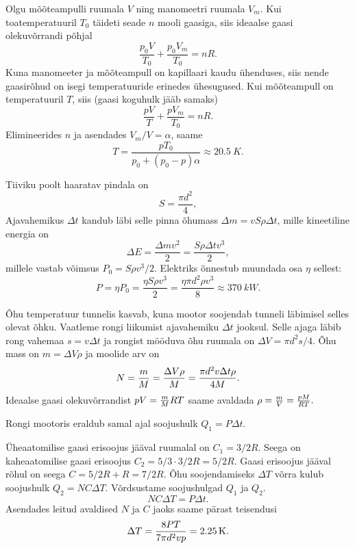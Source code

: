 \documentclass[10pt]{article}
\begin{document}
{%

\solu
Olgu mõõteampulli ruumala $V$ ning manomeetri ruumala $V_m$. Kui toatemperatuuril $T_0$ täideti seade $n$ mooli gaasiga, siis ideaalse gaasi olekuvõrrandi põhjal
\[
\frac{p_0V}{T_0} + \frac{p_0V_m}{T_0} = nR.
\]
Kuna manomeeter ja mõõteampull on kapillaari kaudu ühenduses, siis nende gaasirõhud on isegi temperatuuride erinedes ühesugused. Kui mõõteampull on temperatuuril $T$, siis (gaasi koguhulk jääb samaks)
\[
\frac{pV}{T} + \frac{pV_m}{T_0} = nR.
\]
Elimineerides $n$ ja asendades $V_m/V = \alpha$, saame
\[
T=\frac{p T_{0}}{p_{0}+\left(p_{0}-p\right) \alpha} \approx \SI{20,5}{K}.
\]
\probend
\bigskip


\solu
Tiiviku poolt haaratav pindala on
\[
S = \frac{\pi d^2}{4},
\]
Ajavahemikus $\Delta t$ kandub läbi selle pinna õhumass $\Delta m = vS\rho \Delta t$, mille kineetiline energia on
\[
\Delta E=\frac{\Delta m v^{2}}{2}=\frac{S \rho \Delta t v^{3}}{2},
\]
millele vastab võimsus $P_0 = S\rho v^3/2$. Elektriks õnnestub muundada
osa $\eta$ sellest:
\[
P=\eta P_{0}=\frac{\eta S \rho v^{3}}{2}=\frac{\eta \pi d^2 \rho v^{3}}{8} \approx \SI{370}{kW}.
\]
\probend
\bigskip


\solu
Õhu temperatuur tunnelis kasvab, kuna mootor soojendab tunneli läbimisel selles olevat õhku. Vaatleme rongi liikumist ajavahemiku $\Delta t$ jooksul. Selle ajaga läbib rong vahemaa $s = v \Delta t$ ja rongist mööduva õhu ruumala on $\Delta V = \pi d^2 s /4$. Õhu mass on $m = \Delta V \rho$ ja moolide arv on
\[
N = {m \over M}={\Delta V \rho \over M}={\pi d^2 v \Delta t\rho\over 4M}.
\]
Ideaalse gaasi olekuvõrrandist $pV={m\over M}RT$ saame avaldada $\rho={m\over V}={pM\over RT}.$

Rongi mootoris eraldub samal ajal soojushulk $Q_1 = P \Delta t$.

Üheaatomilise gaasi erisoojus jääval ruumalal on $C_1 = 3/2 R$. Seega on kaheaatomilise gaasi erisoojus $C_2 = 5/3 \cdot 3/2R = 5/2 R$. Gaasi erisoojus jääval rõhul on seega $C = 5/2R + R = 7/2 R$. Õhu soojendamiseks $\Delta T$ võrra kulub soojushulk $Q_2 = N C \Delta T$. Võrdsustame soojushulgad $Q_1$ ja $Q_2$.
\[
N C \Delta T = P \Delta t.
\]
Asendades leitud avaldised $N$ ja $C$ jaoks saame pärast teisendusi
\[
\Delta T = {8 P T \over 7\pi d^2 v p } = \SI{2.25}{K}.
\]
\probend
\bigskip

}
\end{document}
